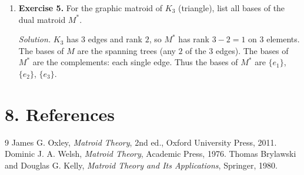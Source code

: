 \begin{enumerate}[leftmargin=*,itemsep=0.9em]
\item \textbf{Exercise 5.} For the graphic matroid of $K_3$ (triangle), list all bases of the dual matroid $M^*$.

\emph{Solution.} $K_3$ has $3$ edges and rank $2$, so $M^*$ has rank $3-2=1$ on $3$ elements. The bases of $M$ are the spanning trees (any $2$ of the $3$ edges). The bases of $M^*$ are the complements: each single edge. Thus the bases of $M^*$ are $\{e_1\}$, $\{e_2\}$, $\{e_3\}$.

\end{enumerate}
\section*{8. References}

\begin{thebibliography}{9}
 James G. Oxley, \emph{Matroid Theory}, 2nd ed., Oxford University Press, 2011.
 Dominic J. A. Welsh, \emph{Matroid Theory}, Academic Press, 1976.
 Thomas Brylawski and Douglas G. Kelly, \emph{Matroid Theory and Its Applications}, Springer, 1980.
\end{thebibliography}